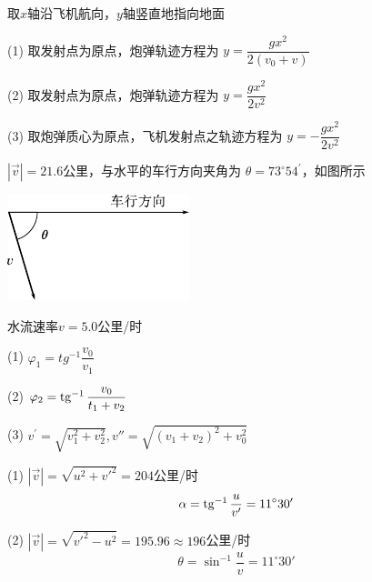 \achapter

\answer 取$ x $轴沿飞机航向，$ y $轴竖直地指向地面

(1) 取发射点为原点，炮弹轨迹方程为
$    y = \dfrac { g x ^ { 2 } } { 2 \left( v _ { 0 } + v \right) }$


(2) 取发射点为原点，炮弹轨迹方程为
$    y = \dfrac { g x ^ { 2 } } { 2 v ^ { 2 } }$

(3) 取炮弹质心为原点，飞机发射点之轨迹方程为
$    y = - \dfrac { g x ^ { 2 } } { 2 v ^ { 2 } }$

\clearpage
\answer $ | \vec{v} | = 2 1 . 6   $公里，与水平的车行方向夹角为 $ \theta = 7 3 ^ { \circ } 5 4 ^ { \prime }   $，如图所示
\begin{figurex}
    \centering
    \includegraphics{figure/figa02.01}
    \caption{}
    \label{figa:02.01}
\end{figurex}

\answer 水流速率$  v = 5 . 0   $公里/时

\answer (1) $ \varphi _ { 1 } = tg ^ { - 1 } \dfrac { v _ { 0 } } { v _ { 1 } }   $

(2) $ \varphi _ { 2 } = \operatorname{tg} ^ { - 1 } \dfrac { v _ { 0 } } { t _ { 1 } + v _ { 2 } }  $

(3) $ v ^ { \prime } = \sqrt { v _ { 1 } ^ { 2 } + v _ { 2 } ^ { 2 } }, v'' = \sqrt { \left( v _ { 1 } + v _ { 2 } \right) ^ { 2 } + v _ 0 ^ { 2 } }  $

\answer (1) $ | \vec{v} | = \sqrt { u ^ { 2 } + {v'} ^ { 2 } } = 2 0 4   $公里/时
\begin{equation*}
    \alpha = \operatorname{tg} ^ { - 1 } \frac { u } { v' } = 1 1^\circ 30'
\end{equation*}

(2) $ | \vec{v} | = \sqrt { {v'} ^ { 2 } - u ^ { 2 } } = 1 9 5 . 9 6 \approx 196 $公里/时
\begin{equation*}
    \theta = \sin ^ { - 1 } \dfrac { u } { v } = 1 1 ^ { \circ } 3 0 '
\end{equation*}\vspace{-1.3em}
\begin{figurex}
    \centering
    \qquad
    \caption{}
    \label{figa:02.02}
\end{figurex}\vspace{-1em}

